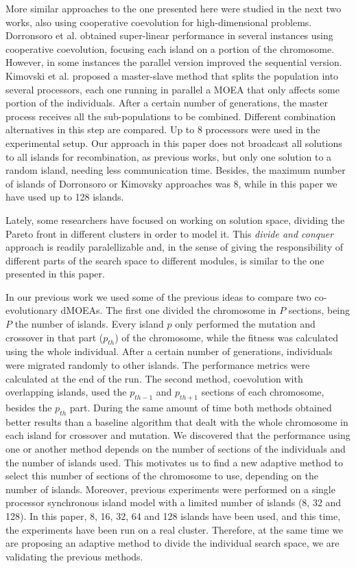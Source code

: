 \documentclass[Crown,sagev,times,doublespace]{sagej}
\begin{document}
More similar approaches to the one presented here were studied in the
next two works, also using cooperative coevolution for high-dimensional problems. 
Dorronsoro et al. \citep{Dorronsoro13superlinear} obtained super-linear performance
in several instances using cooperative coevolution, focusing each island on a portion of the chromosome. However, in some instances the parallel version 
improved the sequential version. Kimovski et al. \citep{Kimovski15Parallel} proposed a
master-slave method that splits the population into several processors,
each one running in parallel a MOEA that only affects some portion of
the individuals. After a certain number of generations, the master
process receives all the sub-populations to be combined. Different
combination alternatives in this step are compared. Up to 8 processors
were used in the experimental setup. Our approach in this paper does not
broadcast all solutions to all islands for recombination, as previous
works, but only one solution to a random island, needing less
communication time. Besides, the maximum number of islands of
Dorronsoro or Kimovsky approaches was 8, while in this paper we have
used up to 128 islands. 

Lately, some researchers \citep{cheng2015adaptive} have focused on
working on solution space, dividing the Pareto front in different
clusters in order to model it. This {\em divide and conquer} approach
is readily paralellizable and, in the sense of giving the
responsibility of different parts of the search space to different
modules, is similar to the one presented in this paper.

In our previous work \citep{Garcia16hpmoonANONYMOUS} we used some of the previous ideas to compare two co-evolutionary dMOEAs. The first one divided the chromosome in $P$ sections, being $P$ the number of islands. Every island $p$ only performed the mutation and crossover in that part ($p_{th}$) of the chromosome, while the fitness was calculated using the whole individual. After a certain number of generations, individuals were migrated randomly to other islands. The performance metrics were calculated at the end of the run. The second method, coevolution with overlapping islands, used the $p_{th-1}$ and $p_{th+1}$ sections of each chromosome, besides the $p_{th}$ part. During the same amount of time both methods obtained better results than a baseline algorithm that dealt with the whole chromosome in each island for crossover and mutation. We discovered that the performance using one or another method depends on the number of sections of the individuals and the number of islands used. This motivates us to find a new adaptive method to select this number of sections of the chromosome to use, depending on the number of islands. Moreover, previous experiments were performed on a single processor synchronous island model with a limited number of islands (8, 32 and 128). In this paper,  8, 16, 32, 64 and 128 islands have been used, and this time, the experiments have been run on a real cluster. Therefore, at the same time we are proposing an adaptive method to divide the individual search space, we are validating the previous methods.
\end{document}
